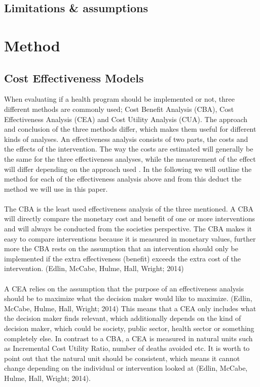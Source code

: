 \documentclass[a4paper,12pt]{article}
\begin{document}
\subsection{Limitations \& assumptions}

\section{Method}

\subsection{Cost Effectiveness Models }

When evaluating if a health program should be implemented or not, three different methods are commonly used; Cost Benefit Analysis (CBA), Cost Effectiveness Analysis (CEA) and Cost Utility Analysis (CUA). The approach and conclusion of the three methods differ, which makes them useful for different kinds of analyses. An effectiveness analysis consists of two parts, the costs and the effects of the intervention. The way the costs are estimated will generally be the same for the three effectiveness analyses, while the measurement of the effect will differ depending on the approach used \cite{Christiansen2010}. In the following we will outline the method for each of the effectiveness analysis above and from this deduct the method we will use in this paper.  
\\\\
The CBA is the least used effectiveness analysis of the three mentioned. A CBA will directly compare the monetary cost and benefit of one or more interventions and will always be conducted from the societies perspective. The CBA makes it easy to compare interventions because it is measured in monetary values, further more the CBA rests on the assumption that an intervention should only be implemented if the extra effectiveness (benefit) exceeds the extra cost of the intervention. (Edlin, McCabe, Hulme, Hall, Wright; 2014)
\\\\
A CEA relies on the assumption that the purpose of an effectiveness analysis should be to maximize what the decision maker would like to maximize. (Edlin, McCabe, Hulme, Hall, Wright; 2014) This means that a CEA only includes what the decision maker finds relevant, which additionally depends on the kind of decision maker, which could be society, public sector, health sector or something completely else. In contrast to a CBA, a CEA is measured in natural units such as Incremental Cost Utility Ratio, number of deaths avoided etc. It is worth to point out that the natural unit should be consistent, which means it cannot change depending on the individual or intervention looked at (Edlin, McCabe, Hulme, Hall, Wright; 2014). 
\end{document}
